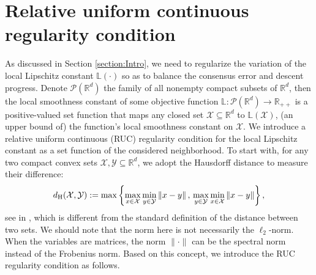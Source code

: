 \documentclass{article}
\newcommand{\cX}{\mathcal{X}}
\newcommand{\cY}{\mathcal{Y}}
\newcommand{\bL}{\mathbb{L}}
\newcommand{\RR}{\mathbb{R}}
\begin{document}
\section{Relative uniform continuous regularity condition}
\label{section:RUC-regularity}
As discussed in Section \ref{section:Intro}, we need to regularize the variation of the local Lipschitz constant $\bL(\cdot)$ so as to balance the consensus error and descent progress. Denote $\mathcal{P}(\mathbb{R}^d)$ the family of all nonempty compact subsets 
of $\RR^d$, then the local smoothness constant of some objective function $\bL :\mathcal{P}(\RR^d)\to\RR_{++}$ is a positive-valued set function that maps any closed set $\cX\subseteq\RR^d$ to $\bL(\cX)$, (an upper bound of) the function's local smoothness constant on $\cX$. We introduce a relative uniform continuous (RUC) regularity condition for the local Lipschitz constant as a set function of the considered neighborhood. To start with, for any two compact convex sets $\cX,\cY\subseteq \RR^d$, we adopt the Hausdorff distance to measure their difference: 
$$d_{\rm H}(\cX,\cY):=\max\left\{\max_{x\in\cX}\min_{y\in\cY}\|x-y\|\,,\,\max_{y\in\cY}\min_{x\in\cX}\|x-y\|\right\},$$
see in \cite{birsan2006one}, which is different from the standard definition of the distance between two sets. We should note that the norm here is not necessarily the $\ell_2$-norm. When the variables are matrices, the norm $\|\cdot\|$ can be the spectral norm instead of the Frobenius norm. Based on this concept, we introduce the RUC regularity condition as follows.
\end{document}
